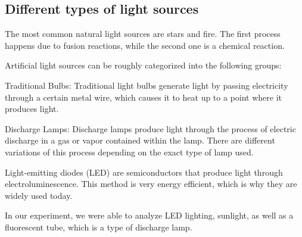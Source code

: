     \subsection{Different types of light sources}

    The most common natural light sources are stars and fire. The first process happens due to fusion reactions, while the
    second one is a chemical reaction.

    Artificial light sources can be roughly categorized into the following groups:

    Traditional Bulbs:
        Traditional light bulbs generate light by passing electricity through a certain metal wire, which causes it
        to heat up to a point where it produces light.

    Discharge Lamps:
        Discharge lamps produce light through the process of electric discharge in a gas or vapor 
        contained within the lamp. There are different variations of this process depending on the exact
        type of lamp used.

    Light-emitting diodes (LED) are semiconductors that produce light through electroluminescence.
    This method is very energy efficient, which is why they are widely used today.

    In our experiment, we were able to analyze LED lighting, sunlight, as well as a fluorescent tube, which is a type of discharge lamp.
